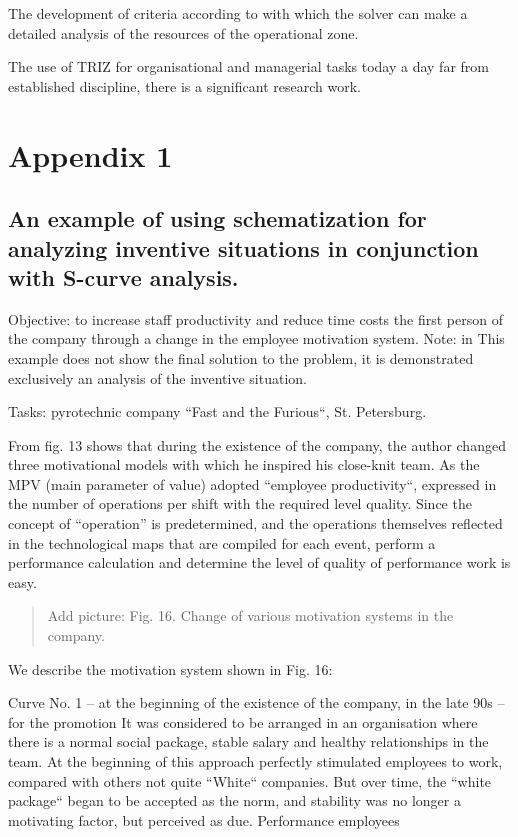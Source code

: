 \documentclass[11pt,a4paper]{book}
\newcommand{\addpicture}[1]{
  \begin{quote} Add picture: #1\end{quote}
}
\begin{document}
The development of criteria according to with which the solver can make a
detailed analysis of the resources of the operational zone.

The use of TRIZ for organisational and managerial tasks today a day far from
established discipline, there is a significant research work.

\appendix
\chapter{Appendix 1}

\section{An example of using schematization for analyzing inventive
  situations in conjunction with S-curve analysis.}

Objective: to increase staff productivity and reduce time costs the first
person of the company through a change in the employee motivation system.
Note: in This example does not show the final solution to the problem, it is
demonstrated exclusively an analysis of the inventive situation.

Tasks: pyrotechnic company “Fast and the Furious“, St. Petersburg.

From fig. 13 shows that during the existence of the company, the author
changed three motivational models with which he inspired his close-knit team.
As the MPV (main parameter of value) adopted “employee productivity“,
expressed in the number of operations per shift with the required level
quality. Since the concept of “operation” is predetermined, and the
operations themselves reflected in the technological maps that are compiled
for each event, perform a performance calculation and determine the level of
quality of performance work is easy.

\addpicture{Fig. 16. Change of various motivation systems in the company.}

We describe the motivation system shown in Fig. 16:

Curve No. 1 -- at the beginning of the existence of the company, in the late
90s -- for the promotion It was considered to be arranged in an organisation
where there is a normal social package, stable salary and healthy
relationships in the team. At the beginning of this approach perfectly
stimulated employees to work, compared with others not quite “White“
companies. But over time, the “white package“ began to be accepted as the
norm, and stability was no longer a motivating factor, but perceived as due.
Performance employees
\end{document}
